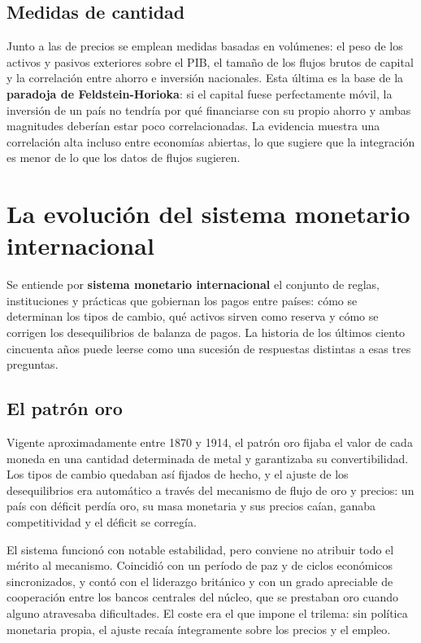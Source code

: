 \subsection{Medidas de cantidad}

Junto a las de precios se emplean medidas basadas en volúmenes: el peso de los
activos y pasivos exteriores sobre el PIB, el tamaño de los flujos brutos de
capital y la correlación entre ahorro e inversión nacionales. Esta última es la
base de la \textbf{paradoja de Feldstein-Horioka}: si el capital fuese
perfectamente móvil, la inversión de un país no tendría por qué financiarse con
su propio ahorro y ambas magnitudes deberían estar poco correlacionadas. La
evidencia muestra una correlación alta incluso entre economías abiertas, lo que
sugiere que la integración es menor de lo que los datos de flujos sugieren.

\section{La evolución del sistema monetario internacional}

Se entiende por \textbf{sistema monetario internacional} el conjunto de reglas,
instituciones y prácticas que gobiernan los pagos entre países: cómo se
determinan los tipos de cambio, qué activos sirven como reserva y cómo se
corrigen los desequilibrios de balanza de pagos. La historia de los últimos
ciento cincuenta años puede leerse como una sucesión de respuestas distintas a
esas tres preguntas.

\subsection{El patrón oro}

Vigente aproximadamente entre 1870 y 1914, el patrón oro fijaba el valor de cada
moneda en una cantidad determinada de metal y garantizaba su convertibilidad.
Los tipos de cambio quedaban así fijados de hecho, y el ajuste de los
desequilibrios era automático a través del mecanismo de flujo de oro y precios:
un país con déficit perdía oro, su masa monetaria y sus precios caían, ganaba
competitividad y el déficit se corregía.

El sistema funcionó con notable estabilidad, pero conviene no atribuir todo el
mérito al mecanismo. Coincidió con un período de paz y de ciclos económicos
sincronizados, y contó con el liderazgo británico y con un grado apreciable de
cooperación entre los bancos centrales del núcleo, que se prestaban oro cuando
alguno atravesaba dificultades. El coste era el que impone el trilema: sin
política monetaria propia, el ajuste recaía íntegramente sobre los precios y el
empleo.

